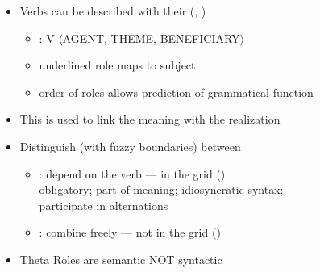 \documentclass[headrule,footrule]{foils}
\begin{document}
\begin{itemize}\addtolength{\itemsep}{-0.9ex}
\item Verbs can be described with their 
  (, )

 \begin{itemize}
 \item  {}: V $\langle$\ul{AGENT}, THEME, BENEFICIARY$\rangle$
 \item  underlined role maps to subject
 \item  order of roles allows prediction of grammatical function
 \end{itemize}
\item  This is used to link the meaning with the realization
\item Distinguish (with fuzzy boundaries) between
  \begin{itemize}
  \item {}: depend on the verb --- in the grid ()
    \\ obligatory; part of meaning; idiosyncratic syntax; 
 \\ participate in alternations 
  \item {}: combine freely --- not in the grid ()
    
  \end{itemize}
\item Theta Roles are semantic NOT syntactic
\end{itemize}
\end{document}
